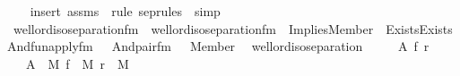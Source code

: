 \begin{isabellebody}
%
\isadelimproof
\ \ %
\endisadelimproof
%
\isatagproof
{}\isamarkupfalse%
\ {\isacharparenleft}{\kern0pt}insert\ assms\ {\isacharsemicolon}{\kern0pt}\ {\isacharparenleft}{\kern0pt}rule\ sep{\isacharunderscore}{\kern0pt}rules\ {\isacharbar}{\kern0pt}\ simp{\isacharparenright}{\kern0pt}{\isacharplus}{\kern0pt}{\isacharparenright}{\kern0pt}%
\endisatagproof
{\isafoldproof}%
%
\isadelimproof
\ \isanewline
%
\endisadelimproof
\isanewline
{}\isamarkupfalse%
\ well{\isacharunderscore}{\kern0pt}ord{\isacharunderscore}{\kern0pt}iso{\isacharunderscore}{\kern0pt}separation{\isacharunderscore}{\kern0pt}fm\ \ {\isachardoublequoteopen}well{\isacharunderscore}{\kern0pt}ord{\isacharunderscore}{\kern0pt}iso{\isacharunderscore}{\kern0pt}separation{\isacharunderscore}{\kern0pt}fm\ {\isasymequiv}\ Implies{\isacharparenleft}{\kern0pt}Member{\isacharparenleft}{\kern0pt}{}{\isacharcomma}{\kern0pt}\ {}{\isacharparenright}{\kern0pt}{\isacharcomma}{\kern0pt}\ Exists{\isacharparenleft}{\kern0pt}Exists{\isacharparenleft}{\kern0pt}And{\isacharparenleft}{\kern0pt}fun{\isacharunderscore}{\kern0pt}apply{\isacharunderscore}{\kern0pt}fm{\isacharparenleft}{\kern0pt}{}{\isacharcomma}{\kern0pt}\ {}{\isacharcomma}{\kern0pt}\ {}{\isacharparenright}{\kern0pt}{\isacharcomma}{\kern0pt}\ And{\isacharparenleft}{\kern0pt}pair{\isacharunderscore}{\kern0pt}fm{\isacharparenleft}{\kern0pt}{}{\isacharcomma}{\kern0pt}\ {}{\isacharcomma}{\kern0pt}\ {}{\isacharparenright}{\kern0pt}{\isacharcomma}{\kern0pt}\ Member{\isacharparenleft}{\kern0pt}{}{\isacharcomma}{\kern0pt}\ {}{\isacharparenright}{\kern0pt}{\isacharparenright}{\kern0pt}{\isacharparenright}{\kern0pt}{\isacharparenright}{\kern0pt}{\isacharparenright}{\kern0pt}{\isacharparenright}{\kern0pt}{\isachardoublequoteclose}\isanewline
\isanewline
{}\isamarkupfalse%
\ well{\isacharunderscore}{\kern0pt}ord{\isacharunderscore}{\kern0pt}iso{\isacharunderscore}{\kern0pt}separation\ {\isacharcolon}{\kern0pt}\ \isanewline
\ \ \ A\ f\ r\ \isanewline
\ \ \ {\isachardoublequoteopen}A\ {\isasymin}\ M{\isachardoublequoteclose}\ {\isachardoublequoteopen}f\ {\isasymin}\ M{\isachardoublequoteclose}\ {\isachardoublequoteopen}r\ {\isasymin}\ M{\isachardoublequoteclose}\ \isanewline

\end{isabellebody}
